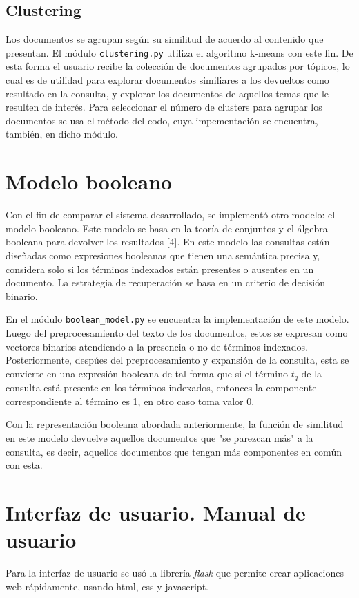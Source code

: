 \documentclass[twoside]{article}
\begin{document}
\subsection{Clustering}
\qquad Los documentos se agrupan seg\'un su similitud de acuerdo al contenido que presentan. El m\'odulo \texttt{clustering.py} utiliza el algoritmo k-means con este fin. De esta forma el usuario recibe la colecci\'on de documentos agrupados por t\'opicos, lo cual es de utilidad para explorar documentos similiares a los devueltos como resultado en la consulta, y explorar los documentos de aquellos temas que le resulten de inter\'es. Para seleccionar el n\'umero de clusters para agrupar los documentos se usa el m\'etodo del codo, cuya impementaci\'on se encuentra, tambi\'en, en dicho m\'odulo.

\section{Modelo booleano}
\qquad Con el fin de comparar el sistema desarrollado, se implement\'o otro modelo: el modelo booleano. Este modelo se basa en la teor\'ia de conjuntos y el \'algebra booleana para devolver los resultados [4]. En este modelo las consultas est\'an dise\~nadas como expresiones booleanas que tienen una sem\'antica precisa y, considera solo si los t\'erminos indexados est\'an presentes o ausentes en un documento. La estrategia de recuperaci\'on se basa en un criterio de decisi\'on binario.

En el m\'odulo \texttt{boolean\_model.py} se encuentra la implementaci\'on de este modelo. Luego del preprocesamiento del texto de los documentos, estos se expresan como vectores binarios atendiendo a la presencia o no de t\'erminos indexados. Posteriormente, desp\'ues del preprocesamiento y expansi\'on de la consulta, esta se convierte en una expresi\'on booleana de tal forma que si el t\'ermino $t_q$ de la consulta est\'a presente en los t\'erminos indexados, entonces la componente correspondiente al t\'ermino es 1, en otro caso toma valor 0.

Con la representaci\'on booleana abordada anteriormente, la funci\'on de similitud en este modelo devuelve aquellos documentos que "se parezcan m\'as" a la consulta, es decir, aquellos documentos que tengan m\'as componentes en com\'un con esta. 


\section{Interfaz de usuario. Manual de usuario}
\qquad Para la interfaz de usuario se us\'o la librer\'ia \textit{flask} que permite crear aplicaciones web r\'apidamente, usando html, css y javascript.
\end{document}
